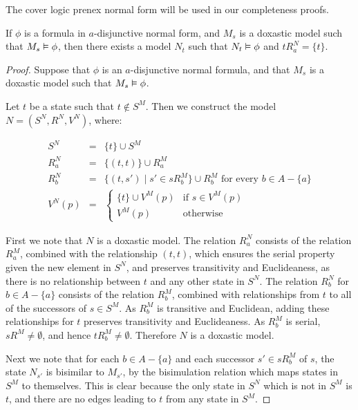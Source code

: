 The cover logic prenex normal form will be used in our completeness proofs.

\begin{lemma}\label{kd45-successors}
If $\phi$ is a formula in $a$-disjunctive normal form, and $M_s$ is a doxastic
model such that $M_s \vDash \phi$, then there exists a model $N_t$ such that
$N_t \vDash \phi$ and $tR^N_a = \{t\}$.
\end{lemma}

\begin{proof}
Suppose that $\phi$ is an $a$-disjunctive normal formula, and that $M_s$ is a
doxastic model such that $M_s \vDash \phi$. 

Let $t$ be a state such that $t \notin S^M$. Then we construct the model $N =
(S^N, R^N, V^N)$, where:

\begin{eqnarray*}
S^N &=& \{t\} \cup S^M\\
R^N_a &=& \{(t, t)\} \cup R^M_a\\
R^N_b &=& \{(t, s') \mid s' \in sR^M_b\} \cup R^M_b \text{ for every $b \in A -
\{a\}$}\\
V^N(p) &=& \begin{cases}
\{t\} \cup V^M(p) & \text{if $s \in V^M(p)$}\\
V^M(p) & \text{otherwise}
\end{cases}
\end{eqnarray*}

First we note that $N$ is a doxastic model. The relation $R^N_a$ consists of the
relation $R^M_a$, combined with the relationship $(t,t)$, which ensures the
serial property given the new element in $S^N$, and preserves transitivity and
Euclideaness, as there is no relationship between $t$ and any other state in
$S^N$. The relation $R^N_b$ for $b \in A - \{a\}$ consists of the relation
$R^M_b$, combined with relationships from $t$ to all of the successors of $s \in
S^M$. As $R^M_b$ is transitive and Euclidean, adding these relationships for $t$
preserves transitivity and Euclideaness. As $R^M_b$ is serial, $sR^M \ne
\emptyset$, and hence $tR^M_b \ne \emptyset$. Therefore $N$ is a doxastic model.

Next we note that for each $b \in A - \{a\}$ and each successor $s' \in sR^M_b$
of $s$, the state $N_{s'}$ is bisimilar to $M_{s'}$, by the bisimulation
relation which maps states in $S^M$ to themselves. This is clear because the
only state in $S^N$ which is not in $S^M$ is $t$, and there are no edges leading
to $t$ from any state in $S^M$.


\end{proof}
